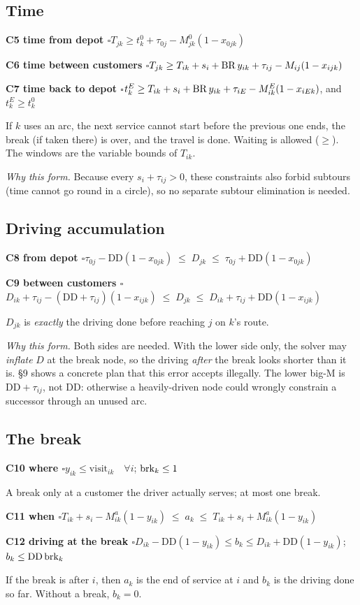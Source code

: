 \documentclass[11pt,a4paper]{article}
\newcommand{\ok}{$\square$}
\newcommand{\cons}[2]{\par\smallskip\noindent\textbf{\color{accent}#1}\quad #2\par}
\newcommand{\why}[1]{{\small\color{gray!70!black}\emph{Why this form.} #1}\par}
\newcommand{\DD}{\mathrm{DD}}\newcommand{\DS}{\mathrm{DS}}\newcommand{\WD}{\mathrm{WD}}
\newcommand{\visit}{\mathrm{visit}}\newcommand{\used}{\mathrm{used}}
\begin{document}
\subsection{Time}

\cons{C5 time from depot \ok}{$T_{jk} \ge t^0_k + \tau_{0j} - M^{0}_{jk}(1-x_{0jk})$}
\cons{C6 time between customers \ok}{$T_{jk} \ge T_{ik} + s_i + \mathrm{BR}\,y_{ik} + \tau_{ij} - M_{ij}(1-x_{ijk})$}
\cons{C7 time back to depot \ok}{$t^E_k \ge T_{ik} + s_i + \mathrm{BR}\,y_{ik} + \tau_{iE} - M^{E}_{ik}(1-x_{iEk})$, \quad and \quad $t^E_k \ge t^0_k$}
\begin{words}If $k$ uses an arc, the next service cannot start before the previous one ends, the break (if taken there) is over, and the travel is done. Waiting is allowed ($\ge$). The windows are the variable bounds of $T_{ik}$.\end{words}
\why{Because every $s_i + \tau_{ij} > 0$, these constraints also forbid subtours (time cannot go round in a circle), so no separate subtour elimination is needed.}

\subsection{Driving accumulation}

\cons{C8 from depot \ok}{$\tau_{0j} - \DD(1-x_{0jk}) \;\le\; D_{jk} \;\le\; \tau_{0j} + \DD(1-x_{0jk})$}
\cons{C9 between customers \ok}{$D_{ik} + \tau_{ij} - (\DD+\tau_{ij})(1-x_{ijk}) \;\le\; D_{jk} \;\le\; D_{ik} + \tau_{ij} + \DD(1-x_{ijk})$}
\begin{words}$D_{jk}$ is \emph{exactly} the driving done before reaching $j$ on $k$'s route.\end{words}
\why{Both sides are needed. With the lower side only, the solver may \emph{inflate} $D$ at the break node, so the driving \emph{after} the break looks shorter than it is. §9 shows a concrete plan that this error accepts illegally. The lower big-M is $\DD+\tau_{ij}$, not $\DD$: otherwise a heavily-driven node could wrongly constrain a successor through an unused arc.}

\subsection{The break}

\cons{C10 where \ok}{$y_{ik} \le \visit_{ik}\quad\forall i$; \qquad $\mathrm{brk}_k \le 1$}
\begin{words}A break only at a customer the driver actually serves; at most one break.\end{words}
\cons{C11 when \ok}{$T_{ik}+s_i - M^{a}_{ik}(1-y_{ik}) \;\le\; a_k \;\le\; T_{ik}+s_i + M^{a}_{ik}(1-y_{ik})$}
\cons{C12 driving at the break \ok}{$D_{ik} - \DD(1-y_{ik}) \le b_k \le D_{ik} + \DD(1-y_{ik})$; \qquad $b_k \le \DD\,\brk_k$}
\begin{words}If the break is after $i$, then $a_k$ is the end of service at $i$ and $b_k$ is the driving done so far. Without a break, $b_k = 0$.\end{words}
\end{document}
